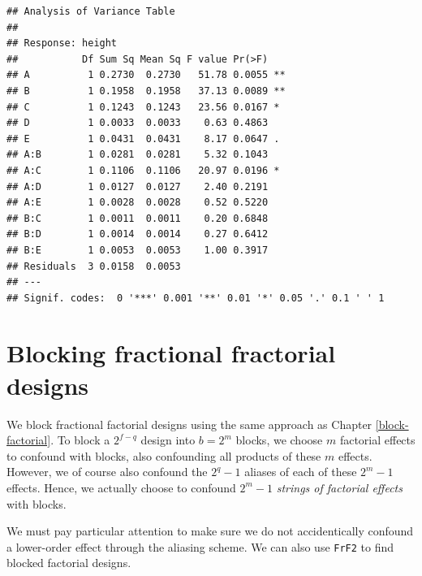 \documentclass[
]{book}
\theoremstyle{definition}
\theoremstyle{definition}
\theoremstyle{definition}
\theoremstyle{definition}
\theoremstyle{remark}
\begin{document}
\begin{verbatim}
## Analysis of Variance Table
## 
## Response: height
##           Df Sum Sq Mean Sq F value Pr(>F)   
## A          1 0.2730  0.2730   51.78 0.0055 **
## B          1 0.1958  0.1958   37.13 0.0089 **
## C          1 0.1243  0.1243   23.56 0.0167 * 
## D          1 0.0033  0.0033    0.63 0.4863   
## E          1 0.0431  0.0431    8.17 0.0647 . 
## A:B        1 0.0281  0.0281    5.32 0.1043   
## A:C        1 0.1106  0.1106   20.97 0.0196 * 
## A:D        1 0.0127  0.0127    2.40 0.2191   
## A:E        1 0.0028  0.0028    0.52 0.5220   
## B:C        1 0.0011  0.0011    0.20 0.6848   
## B:D        1 0.0014  0.0014    0.27 0.6412   
## B:E        1 0.0053  0.0053    1.00 0.3917   
## Residuals  3 0.0158  0.0053                  
## ---
## Signif. codes:  0 '***' 0.001 '**' 0.01 '*' 0.05 '.' 0.1 ' ' 1
\end{verbatim}

\hypertarget{blocking-fractional-fractorial-designs}{%
\section{Blocking fractional fractorial designs}\label{blocking-fractional-fractorial-designs}}

We block fractional factorial designs using the same approach as Chapter \ref{block-factorial}. To block a \(2^{f-q}\) design into \(b = 2^m\) blocks, we choose \(m\) factorial effects to confound with blocks, also confounding all products of these \(m\) effects. However, we of course also confound the \(2^q-1\) aliases of each of these \(2^m-1\) effects. Hence, we actually choose to confound \(2^m-1\) \emph{strings of factorial effects} with blocks.

We must pay particular attention to make sure we do not accidentically confound a lower-order effect through the aliasing scheme. We can also use \texttt{FrF2} to find blocked factorial designs.
\end{document}
